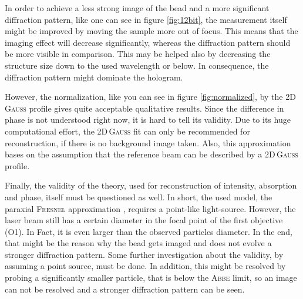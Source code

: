 \documentclass{article}
\begin{document}
In order to achieve a less strong image of the bead and a more significant diffraction pattern, like one can see in figure \ref{fig:12bit}, the measurement itself might be improved by moving the sample more out of focus. This means that the imaging effect will decrease significantly, whereas the diffraction pattern should be more visible in comparison. This may be helped also by decreasing the structure size down to the used wavelength or below. In consequence, the diffraction pattern might dominate the hologram.

However, the normalization, like you can see in figure \ref{fig:normalized}, by the 2D\,\textsc{Gauss} profile gives quite acceptable qualitative results. Since the difference in phase is not understood right now, it is hard to tell its validity. Due to its huge computational effort, the 2D\,\textsc{Gauss} fit can only be recommended for reconstruction, if there is no background image taken. Also, this approximation bases on the assumption that the reference beam can be described by a 2D\,\textsc{Gauss} profile.

Finally, the validity of the theory, used for reconstruction of intensity, absorption and phase, itself must be questioned as well. In short, the used model, the paraxial \textsc{Fresnel} approximation \cite{Latychevskaia}, requires a point-like light-source. However, the laser beam still has a certain diameter in the focal point of the first objective (O1). In Fact, it is even larger than the observed particles diameter. In the end, that might be the reason why the bead gets imaged and does not evolve a stronger diffraction pattern. Some further investigation about the validity, by assuming a point source, must be done.
In addition, this might be resolved by probing a significantly smaller particle, that is below the \textsc{Abbe} limit, so an image can not be resolved and a stronger diffraction pattern can be seen. 

\clearpage
\setcounter{page}{1}
\printbibliography[heading=bibintoc]
\newpage
\appendix
\end{document}

